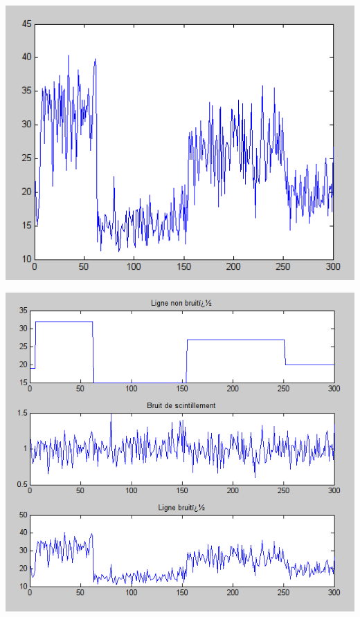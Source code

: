 \documentclass{beamer}
\begin{document}
\begin{frame}
\begin{center}
\includegraphics[scale=0.5]{capture/C.png}
\end{center}
\end{frame}

\begin{frame}
\begin{center}
\includegraphics[scale=0.4]{capture/D.png}
\end{center}
\end{frame}
\end{document}
